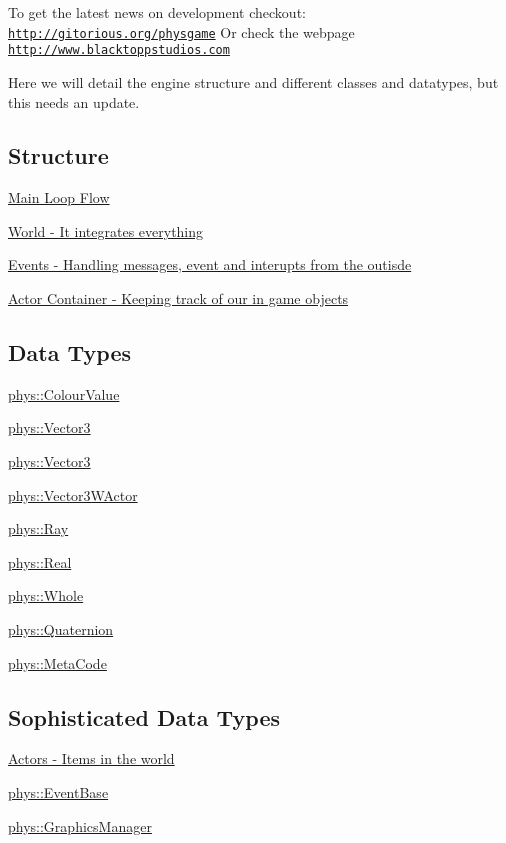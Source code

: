 To get the latest news on development checkout: \href{http://gitorious.org/physgame}{\tt http://gitorious.org/physgame} Or check the webpage \href{http://www.blacktoppstudios.com}{\tt http://www.blacktoppstudios.com}

Here we will detail the engine structure and different classes and datatypes, but this needs an update.\hypertarget{index_Engine}{}\subsection{Structure}\label{index_Engine}
\hyperlink{mainloop1}{Main Loop Flow}

\hyperlink{classphys_1_1World}{World -\/ It integrates everything}

\hyperlink{classphys_1_1EventManager}{Events -\/ Handling messages, event and interupts from the outisde}

\hyperlink{actorcontainer1}{Actor Container -\/ Keeping track of our in game objects}\hypertarget{index_Types}{}\subsection{Data Types}\label{index_Types}
\hyperlink{classphys_1_1ColourValue}{phys::ColourValue}

\hyperlink{classphys_1_1Vector3}{phys::Vector3}

\hyperlink{classphys_1_1Vector3}{phys::Vector3}

\hyperlink{classphys_1_1Vector3WActor}{phys::Vector3WActor}

\hyperlink{classphys_1_1Ray}{phys::Ray}

\hyperlink{namespacephys_af7eb897198d265b8e868f45240230d5f}{phys::Real}

\hyperlink{namespacephys_a460f6bc24c8dd347b05e0366ae34f34a}{phys::Whole}

\hyperlink{classphys_1_1Quaternion}{phys::Quaternion}

\hyperlink{classphys_1_1MetaCode}{phys::MetaCode}\hypertarget{index_Classes}{}\subsection{Sophisticated Data Types}\label{index_Classes}
\hyperlink{classphys_1_1ActorBase}{Actors -\/ Items in the world}

\hyperlink{classphys_1_1EventBase}{phys::EventBase}

\hyperlink{classphys_1_1GraphicsManager}{phys::GraphicsManager} 